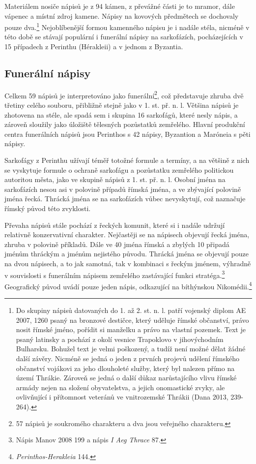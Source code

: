 Materiálem nosiče nápisů je z 94  kámen, z převážné části je to mramor, dále vápenec a místní zdroj kamene. Nápisy na kovových předmětech se dochovaly pouze dva.\footnote{Do skupiny nápisů datovaných do 1. až 2. st. n. l. patří vojenský diplom AE 2007, 1260 psaný na bronzové destičce, který uděluje římské občanství, právo nosit římské jméno, pořídit si manželku a právo na vlastní pozemek. Text je psaný latinsky a pochází z okolí vesnice Trapoklovo v jihovýchodním Bulharsku. Bohužel text je velmi poškozený, a tudíž není možné dělat žádné další závěry. Nicméně se jedná o jeden z prvních projevů udělení římského občanství vojákovi za jeho dlouholeté služby, který byl nalezen přímo na území Thrákie. Zároveň se jedná o další důkaz narůstajícího vlivu římské armády nejen na složení obyvatelstva, a jejich onomastické zvyky, ale ovlivňující i přítomnost veteránů ve vnitrozemské Thrákii (Dana 2013, 239-264).} Nejoblíbenější formou kamenného nápisu je i nadále stéla, nicméně v této době se stávají populární i funerální nápisy na sarkofázích, pocházejících v 15 případech z Perinthu (Hérakleii) a v jednom z Byzantia.

\subsection[funerální-nápisy-12]{Funerální nápisy}

Celkem 59 nápisů je interpretováno jako funerální\footnote{57 nápisů je soukromého charakteru a dva jsou veřejného charakteru.}, což představuje zhruba dvě třetiny celého souboru, přibližně stejně jako v 1. st. př. n. l. Většina nápisů je zhotovena na stéle, ale spadá sem i skupina 16 sarkofágů, které nesly nápis, a zároveň sloužily jako úložiště tělesných pozůstatků zemřelého. Hlavní produkční centra funerálních nápisů jsou Perinthos s 42 nápisy, Byzantion a Maróneia s pěti nápisy.

Sarkofágy z Perinthu užívají téměř totožné formule a termíny, a na většině z nich se vyskytuje formule o ochraně sarkofágu a pozůstatku zemřelého politickou autoritou města, jako ve skupině nápisů z 1. st. př. n. l. Osobní jména na sarkofázích nesou asi v polovině případů římská jména, a ve zbývající polovině jména řecká. Thrácká jména se na sarkofázích vůbec nevyskytují, což naznačuje římský původ této zvyklosti.

Převaha nápisů stále pochází z řeckých komunit, které si i nadále udržují relativně konzervativní charakter. Nejčastěji se na nápisech objevují řecká jména, zhruba v polovině příkladů. Dále ve 40  jména římská a zbylých 10  připadá jménům thráckým a jménům nejistého původu. Thrácká jména se objevují pouze na dvou nápisech, a to jak samotná, tak v kombinaci s řeckým jménem, výhradně v souvislosti s funerálním nápisem zemřelého zastávající funkci stratéga.\footnote{Nápis Manov 2008 199 a nápis {\em I Aeg Thrace} 87.} Geografický původ uvádí pouze jeden nápis, odkazující na bíthýnskou Nikomédii.\footnote{{\em Perinthos-Herakleia} 144.}

